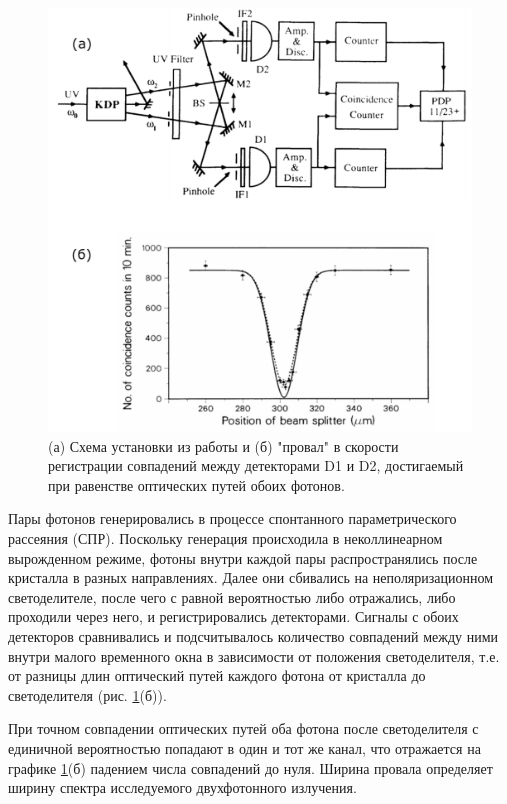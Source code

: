 \documentclass[12pt,a5paper]{article}
\numberwithin{equation}{section}
\begin{document}
\begin{figure}[]
  \begin{center}
  \includegraphics[width=\linewidth]{HOM_paper3.pdf}
  \caption{(а) Схема установки из работы \cite{Hong1987} и (б) "провал" в скорости регистрации совпадений между детекторами D1 и D2, достигаемый при равенстве оптических путей обоих фотонов. }\label{fig:HOM_paper}
  \end{center}
  \end{figure}

Пары фотонов генерировались в процессе спонтанного параметрического рассеяния (СПР). Поскольку генерация происходила в неколлинеарном вырожденном режиме, фотоны внутри каждой пары распространялись после кристалла в разных направлениях. Далее они сбивались на неполяризационном светоделителе, после чего с равной вероятностью либо отражались, либо проходили через него, и регистрировались детекторами. Сигналы с обоих детекторов сравнивались и подсчитывалось количество совпадений между ними внутри малого временного окна в зависимости от положения светоделителя, т.е. от разницы длин оптический путей каждого фотона от кристалла до светоделителя (рис. \ref{fig:HOM_paper}(б)).

При точном совпадении оптических путей оба фотона после светоделителя с единичной вероятностью попадают в один и тот же канал, что отражается на графике \ref{fig:HOM_paper}(б) падением числа совпадений до нуля. Ширина провала определяет ширину спектра исследуемого двухфотонного излучения.
\end{document}
